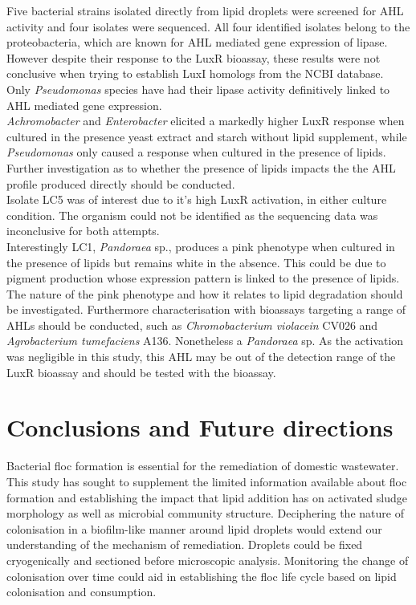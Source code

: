 \documentclass[twoside]{article}
\begin{document}
Five bacterial strains isolated directly from lipid droplets were screened for AHL activity and four isolates were sequenced. All four identified isolates belong to the proteobacteria, which are known for AHL mediated gene expression of lipase. However despite their response to the LuxR bioassay, these results were not conclusive when trying to establish LuxI homologs from the NCBI database. Only \emph{Pseudomonas} species have had their lipase activity definitively linked to AHL mediated gene expression. \\

\emph{Achromobacter} and \emph{Enterobacter} elicited a markedly higher LuxR response when cultured in the presence yeast extract and starch without lipid supplement, while \emph{Pseudomonas} only caused a response when cultured in the presence of lipids. Further investigation as to whether the presence of lipids impacts the the AHL profile produced directly should be conducted. \\

Isolate LC5 was of interest due to it's high LuxR activation, in either culture condition. The organism could not be identified as the sequencing data was inconclusive for both attempts.\\

Interestingly LC1, \emph{Pandoraea} sp., produces a pink phenotype when cultured in the presence of lipids but remains white in the absence. This could be due to pigment production whose expression pattern is linked to the presence of lipids. The nature of the pink phenotype and how it relates to lipid degradation should be investigated. 
Furthermore characterisation with bioassays targeting a range of AHLs should be conducted, such as \emph{Chromobacterium violacein} CV026 and \emph{Agrobacterium tumefaciens} A136.
Nonetheless a \emph{Pandoraea} sp.  As the activation was negligible in this study, this AHL may be out of the detection range of the LuxR bioassay and should be tested with the  bioassay.
\newpage
\section{Conclusions and Future directions}
\thispagestyle{plain}
Bacterial floc formation is essential for the remediation of domestic wastewater. This study has sought to supplement the limited information available about floc formation and establishing the impact that lipid addition has on activated sludge morphology as well as microbial community structure. Deciphering the nature of colonisation in a biofilm-like manner around lipid droplets would extend our understanding of the mechanism of remediation. Droplets could be fixed cryogenically and sectioned before microscopic analysis. Monitoring the change of colonisation over time could aid in establishing the floc life cycle based on lipid colonisation and consumption. \\
\end{document}
